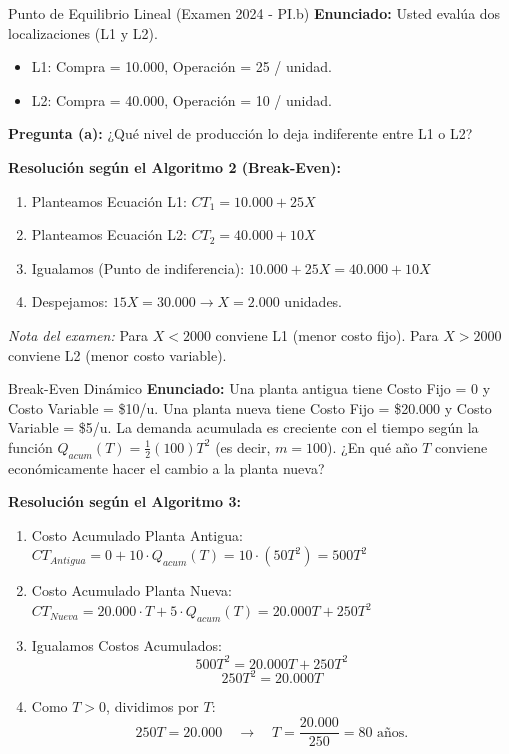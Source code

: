 \vspace{0.4cm}
\begin{ejercicio}{Punto de Equilibrio Lineal (Examen 2024 - PI.b)}
\textbf{Enunciado:} Usted evalúa dos localizaciones (L1 y L2).
\begin{itemize}
    \item L1: Compra = 10.000, Operación = 25 / unidad.
    \item L2: Compra = 40.000, Operación = 10 / unidad.
\end{itemize}

\textbf{Pregunta (a):} ¿Qué nivel de producción lo deja indiferente entre L1 o L2?

\textbf{Resolución según el Algoritmo 2 (Break-Even):}
\begin{enumerate}
    \item Planteamos Ecuación L1: $CT_1 = 10.000 + 25X$
    \item Planteamos Ecuación L2: $CT_2 = 40.000 + 10X$
    \item Igualamos (Punto de indiferencia): 
    $10.000 + 25X = 40.000 + 10X$
    \item Despejamos: $15X = 30.000 \rightarrow X = 2.000$ unidades.
\end{enumerate}
\textit{Nota del examen:} Para $X < 2000$ conviene L1 (menor costo fijo). Para $X > 2000$ conviene L2 (menor costo variable).
\end{ejercicio}

\vspace{0.4cm}
\begin{ejercicio}{Break-Even Dinámico}
\textbf{Enunciado:} Una planta antigua tiene Costo Fijo = 0 y Costo Variable = \$10/u. Una planta nueva tiene Costo Fijo = \$20.000 y Costo Variable = \$5/u. La demanda acumulada es creciente con el tiempo según la función $Q_{acum}(T) = \frac{1}{2} (100) T^2$ (es decir, $m=100$). 
¿En qué año $T$ conviene económicamente hacer el cambio a la planta nueva?

\textbf{Resolución según el Algoritmo 3:}
\begin{enumerate}
    \item Costo Acumulado Planta Antigua: $CT_{Antigua} = 0 + 10 \cdot Q_{acum}(T) = 10 \cdot (50 T^2) = 500 T^2$
    \item Costo Acumulado Planta Nueva: $CT_{Nueva} = 20.000 \cdot T + 5 \cdot Q_{acum}(T) = 20.000 T + 250 T^2$
    \item Igualamos Costos Acumulados:
    $$ 500 T^2 = 20.000 T + 250 T^2 $$
    $$ 250 T^2 = 20.000 T $$
    \item Como $T > 0$, dividimos por $T$:
    $$ 250 T = 20.000 \quad \rightarrow \quad T = \frac{20.000}{250} = 80 \text{ años.} $$
\end{enumerate}
\end{ejercicio}
